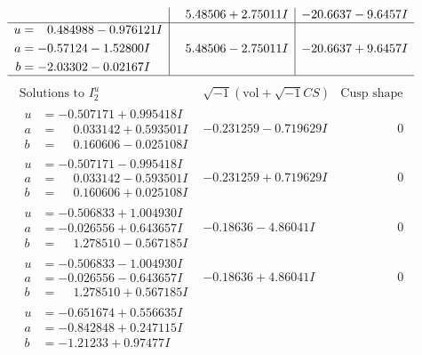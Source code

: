 \documentclass[1p]{elsarticle_modified}
\theoremstyle{definition}
\newcommand{\I}{\sqrt{-1}}
\begin{document}
$$\begin{array}{c|c|c}
 & \phantom{-}5.48506 + 2.75011 I & -20.6637 - 9.6457 I \\ \hline\begin{aligned}
u &= \phantom{-}0.484988 - 0.976121 I \\
a &= -0.57124 - 1.52800 I \\
b &= -2.03302 - 0.02167 I\end{aligned}
 & \phantom{-}5.48506 - 2.75011 I & -20.6637 + 9.6457 I\\
 \hline 
 \end{array}$$\newpage$$\begin{array}{c|c|c}  
\text{Solutions to }I^u_{2}& \I (\text{vol} + \sqrt{-1}CS) & \text{Cusp shape}\\
 \hline 
\begin{aligned}
u &= -0.507171 + 0.995418 I \\
a &= \phantom{-}0.033142 + 0.593501 I \\
b &= \phantom{-}0.160606 - 0.025108 I\end{aligned}
 & -0.231259 - 0.719629 I & \phantom{-0.000000 } 0 \\ \hline\begin{aligned}
u &= -0.507171 - 0.995418 I \\
a &= \phantom{-}0.033142 - 0.593501 I \\
b &= \phantom{-}0.160606 + 0.025108 I\end{aligned}
 & -0.231259 + 0.719629 I & \phantom{-0.000000 } 0 \\ \hline\begin{aligned}
u &= -0.506833 + 1.004930 I \\
a &= -0.026556 + 0.643657 I \\
b &= \phantom{-}1.278510 - 0.567185 I\end{aligned}
 & -0.18636 - 4.86041 I & \phantom{-0.000000 } 0 \\ \hline\begin{aligned}
u &= -0.506833 - 1.004930 I \\
a &= -0.026556 - 0.643657 I \\
b &= \phantom{-}1.278510 + 0.567185 I\end{aligned}
 & -0.18636 + 4.86041 I & \phantom{-0.000000 } 0 \\ \hline\begin{aligned}
u &= -0.651674 + 0.556635 I \\
a &= -0.842848 + 0.247115 I \\
b &= -1.21233 + 0.97477 I\end{aligned}

\end{array}$$
\end{document}
